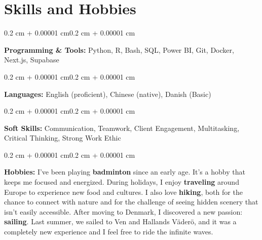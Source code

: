 \documentclass[10pt, letterpaper]{article}
\newenvironment{onecolentry}{
    \begin{adjustwidth}{0.2 cm + 0.00001 cm}{0.2 cm + 0.00001 cm}
}{
    \end{adjustwidth}
}
\begin{document}
    \section{Skills and Hobbies}

        \begin{onecolentry}
            \textbf{Programming \& Tools:} Python, R, Bash, SQL, Power BI, Git, Docker, Next.js, Supabase
        \end{onecolentry}

        \vspace{0.2 cm}

        \begin{onecolentry}
            \textbf{Languages:} English (proficient), Chinese (native), Danish (Basic)
        \end{onecolentry}

        \vspace{0.2 cm}

        \begin{onecolentry}
            \textbf{Soft Skills:} Communication, Teamwork, Client Engagement, Multitasking, Critical Thinking, Strong Work Ethic
        \end{onecolentry}

        \vspace{0.2 cm}

        \begin{onecolentry}
            \textbf{Hobbies:}
            I've been playing \textbf{badminton} since an early age. It's a hobby that keeps me focused and energized. During holidays, I enjoy \textbf{traveling} around Europe to experience new food and cultures. I also love \textbf{hiking}, both for the chance to connect with nature and for the challenge of seeing hidden scenery that isn't easily accessible. After moving to Denmark, I discovered a new passion: \textbf{sailing}. Last summer, we sailed to Ven and Hallands Väderö, and it was a completely new experience and I feel free to ride the infinite waves.
        \end{onecolentry}
\end{document}
